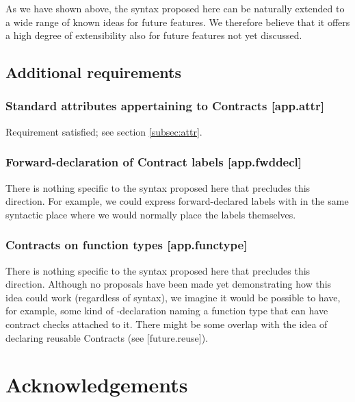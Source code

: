 As we have shown above, the syntax proposed here can be naturally extended to a wide range of known ideas for future features. We therefore believe that it offers a high degree of extensibility also for future features not yet discussed.

\label{subsec:future}

\subsection{Additional requirements}

\subsubsection{Standard attributes appertaining to Contracts  [app.attr]}

Requirement satisfied; see section \ref{subsec:attr}.

\subsubsection{ Forward-declaration of Contract labels  [app.fwddecl]}

There is nothing specific to the syntax proposed here that precludes this direction. For example, we could express forward-declared labels with  in the same syntactic place where we would normally place the labels themselves.

\subsubsection{Contracts on function types  [app.functype]}

There is nothing specific to the syntax proposed here that precludes this direction. Although no proposals have been made yet demonstrating how this idea could work (regardless of syntax), we imagine it would be possible to have, for example, some kind of -declaration naming a function type that can have contract checks attached to it. There might be some overlap with the idea of declaring reusable Contracts (see [future.reuse]).

\section*{Acknowledgements}

